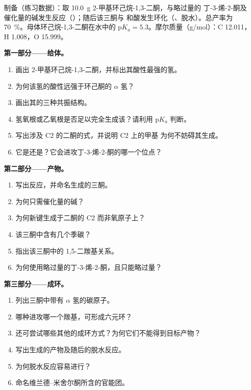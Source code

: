 \begin{problem}
\label{pb:b2:conjugate-additions:1}
制备（练习数据）：取 \qty{10.0}{g} 2-甲基环己烷-1,3-二酮，与略过量的
丁-3-烯-2-酮及催化量的碱发生反应（）；随后该三酮与
和酸发生环化（、脱水）。总产率为 70~\%。母体环己烷-1,3-二酮在水中的
$\mathrm pK_a = 5.3$。摩尔质量（\unit{g/mol}）：C 12.011，H 1.008，O 15.999。

\medskip
\noindent\textbf{第一部分——给体。}
\begin{enumerate}
  \item 画出 2-甲基环己烷-1,3-二酮，并标出其酸性最强的氢。
  \item 为何该氢的酸性远强于环己酮的 $\alpha$ 氢？
  \item 画出其的三种共振结构。
  \item 氢氧根或乙氧根是否足以完全生成该？请利用 $\mathrm pK_a$ 判断。
  \item 写出涉及 C2 的二酮的式，并说明 C2 上的甲基
        为何不妨碍其生成。
  \item 它是还是？它会进攻丁-3-烯-2-酮的哪一个位点？
\end{enumerate}

\medskip
\noindent\textbf{第二部分——产物。}
\begin{enumerate}[resume]
  \item 写出反应，并命名生成的三酮。
  \item 为何只需催化量的碱？
  \item 为何新键生成于二酮的 C2 而非氧原子上？
  \item 该三酮中含有几个季碳？
  \item 指出该三酮中的 1,5-二羰基关系。
  \item 为何使用略过量的丁-3-烯-2-酮，且只能略过量？
\end{enumerate}

\medskip
\noindent\textbf{第三部分——成环。}
\begin{enumerate}[resume]
  \item 列出三酮中带有 $\alpha$ 氢的碳原子。
  \item 哪种进攻哪一个羰基，可形成六元环？
  \item 还可尝试哪些其他的成环方式？为何它们不能得到目标产物？
  \item 写出生成的产物及随后的脱水反应。
  \item 为何脱水反应容易进行？
  \item 命名维兰德–米舍尔酮所含的官能团。
\end{enumerate}


\end{problem}
